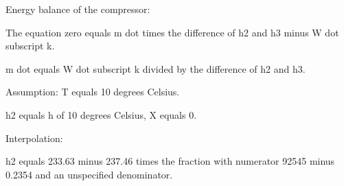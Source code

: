 Energy balance of the compressor:

The equation zero equals m dot times the difference of h2 and h3 minus W dot subscript k.

m dot equals W dot subscript k divided by the difference of h2 and h3.

Assumption: T equals 10 degrees Celsius.

h2 equals h of 10 degrees Celsius, X equals 0.

Interpolation:

h2 equals 233.63 minus 237.46 times the fraction with numerator 92545 minus 0.2354 and an unspecified denominator.